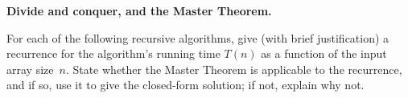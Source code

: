 \documentclass[11pt,addpoints]{exam}
\begin{document}
\begin{questions}
  \question \textbf{Divide and conquer, and the Master Theorem.}

  For each of the following recursive algorithms, give (with brief justification) a recurrence for the algorithm's running time $T(n)$ as a function of the input array size~$n$.
  State whether the Master Theorem is applicable to the recurrence, and if so, use it to give the closed-form solution; if not, explain why not.

\end{questions}
\end{document}
